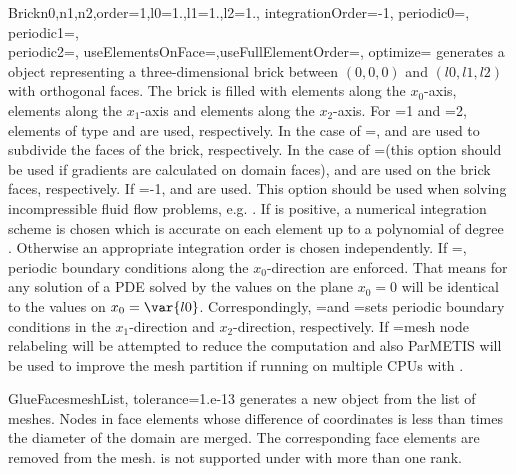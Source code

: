\begin{funcdesc}{Brick}{n0,n1,n2,order=1,l0=1.,l1=1.,l2=1., integrationOrder=-1,
  periodic0=\False, periodic1=\False, \\ periodic2=\False, useElementsOnFace=\False,useFullElementOrder=\False, optimize=\False}
generates a \Domain object representing a three-dimensional brick between
$(0,0,0)$ and $(l0,l1,l2)$ with orthogonal faces. The brick is filled with
 elements along the $x_0$-axis,
 elements along the $x_1$-axis and
 elements along the $x_2$-axis.
For =1 and =2, elements of type  and
 are used, respectively.
In the case of =\False,  and
 are used to subdivide the faces of the brick, respectively.
In the case of =\True (this option should be used if
gradients are calculated on domain faces),  and
 are used on the brick faces, respectively.
If =-1,  and 
are used. This option should be used when solving incompressible fluid flow
problems, e.g. .
If  is positive, a numerical integration scheme is chosen
which is accurate on each element up to a polynomial of degree
.
Otherwise an appropriate integration order is chosen independently.
If =\True, periodic boundary conditions
along the $x_0$-direction are enforced.
That means for any solution of a PDE solved by \finley the values on the plane
$x_0=0$ will be identical to the values on $x_0=\var{l0}$.
Correspondingly, =\True and =\True sets periodic
boundary conditions in the $x_1$-direction and $x_2$-direction, respectively.
If =\True mesh node relabeling will be attempted to reduce the
computation and also ParMETIS will be used to improve the mesh partition if
running on multiple CPUs with \MPI.
\end{funcdesc}

\begin{funcdesc}{GlueFaces}{meshList, tolerance=1.e-13}
generates a new \Domain object from the list  of \finley meshes.
Nodes in face elements whose difference of coordinates is less than
 times the diameter of the domain are merged.
The corresponding face elements are removed from the mesh.
 is not supported under \MPI with more than one rank.
\end{funcdesc}

